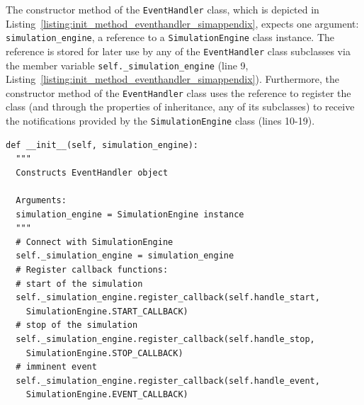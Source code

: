 The constructor method of the \lstinline{EventHandler} class, which is depicted in Listing~\ref{listing:init_method_eventhandler_simappendix}, expects one argument: \lstinline{simulation_engine}, a reference to a \lstinline{SimulationEngine} class instance. The reference is stored for later use by any of the \lstinline{EventHandler} class subclasses via the member variable \lstinline{self._simulation_engine} (line 9, Listing~\ref{listing:init_method_eventhandler_simappendix}). Furthermore, the constructor method of the \lstinline{EventHandler} class uses the reference to register the class (and through the properties of inheritance, any of its subclasses) to receive the notifications provided by the \lstinline{SimulationEngine} class (lines 10-19).
\begin{lstlisting}[caption=\lstinline{__init__(simulation_engine)} member method of the \lstinline{EventHandler} class, label=listing:init_method_eventhandler_simappendix]
def __init__(self, simulation_engine):
  """
  Constructs EventHandler object

  Arguments:
  simulation_engine = SimulationEngine instance
  """
  # Connect with SimulationEngine
  self._simulation_engine = simulation_engine
  # Register callback functions:
  # start of the simulation
  self._simulation_engine.register_callback(self.handle_start,
    SimulationEngine.START_CALLBACK)
  # stop of the simulation
  self._simulation_engine.register_callback(self.handle_stop,
    SimulationEngine.STOP_CALLBACK)
  # imminent event
  self._simulation_engine.register_callback(self.handle_event,
    SimulationEngine.EVENT_CALLBACK)
\end{lstlisting}

